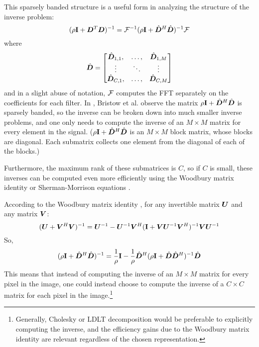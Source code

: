 This sparsely banded structure is a useful form in analyzing the structure of the inverse problem:
\begin{equation}
(\rho {\bf I} + \bm{D}^T\bm{D})^{-1} = \mathcal{F}^{-1}(\rho{\bf I} + \hat{\bm{D}}^H\hat{\bm{D}})^{-1}\mathcal{F}
\end{equation}
%
where
\begin{equation}
\hat{\bm{D}} = \begin{bmatrix}
\hat{\bm{D}}_{1,1}, & \hdots, & \hat{\bm{D}}_{1,M}\\
\vdots & \ddots & \vdots\\
\hat{\bm{D}}_{C,1}, & \hdots, & \hat{\bm{D}}_{C,M}
\end{bmatrix}
\end{equation}
%
and in a slight abuse of notation, $\mathcal{F}$ computes the FFT separately on the coefficients for each filter.  In \cite{Bristow2013fast}, Bristow et al. observe the matrix $\rho{\bf I} + \hat{\bm{D}}^H\hat{\bm{D}}$ is sparsely banded, so the inverse can be broken down into much smaller inverse problems, and one only needs to compute the inverse of an $M \times M$ matrix for every element in the signal. ($\rho{\bf I} + \hat{\bm{D}}^H\hat{\bm{D}}$ is an $M \times M$ block matrix, whose blocks are diagonal.  Each submatrix collects one element from the diagonal of each of the blocks.)

Furthermore, the maximum rank of these submatrices is $C$, so if $C$ is small, these inverses can be computed even more efficiently using the Woodbury matrix identity or Sherman-Morrison equations \cite{vsorel2016fast} \cite{heide2015fast} \cite{wohlberg2015efficient}.

According to the Woodbury matrix identity \cite{henderson1981deriving}, for any invertible matrix $\bm{U}$ and any matrix $\bm{V}$:
\begin{equation}
(\bm{U} + \bm{V}^H\bm{V})^{-1} = \bm{U}^{-1} - \bm{U}^{-1}\bm{V}^H({\bf I} + \bm{V}\bm{U}^{-1}\bm{V}^H)^{-1}\bm{V}\bm{U}^{-1}
\end{equation}
%
So,
\begin{equation}
(\rho{\bf I} + \hat{\bm{D}}^H\hat{\bm{D}})^{-1} = \frac{1}{\rho}{\bf I} - \frac{1}{\rho}\hat{\bm{D}}^H(\rho{\bf I} + \hat{\bm{D}}\hat{\bm{D}}^H)^{-1}\hat{\bm{D}}
\end{equation}
%
This means that instead of computing the inverse of an $M \times M$ matrix for every pixel in the image, one could instead choose to compute the inverse of a $C \times C$ matrix for each pixel in the image.\footnote{Generally, Cholesky or LDLT decomposition would be preferable to explicitly computing the inverse, and the efficiency gains due to the Woodbury matrix identity are relevant regardless of the chosen representation.}

